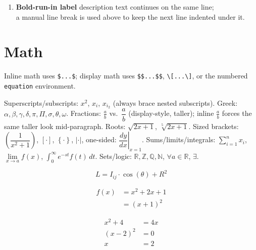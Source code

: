 \documentclass{article}
\newcommand{\set}[1]{\setlength\itemsep{#1em}} %
\begin{document}
\begin{enumerate}[leftmargin=*,label=]
    \set{0.5} %
    \item \textbf{Bold-run-in label} description text continues on the same line;\\
        a manual line break is used above to keep the next line indented under it.
\end{enumerate}

\section{Math}

Inline math uses \verb|$...$|; display math uses \verb|$$...$$|, \verb|\[...\]|,
or the numbered \verb|equation| environment.

Superscripts/subscripts: $x^2$, $x_i$, $x_{i_2}$ (always brace nested subscripts).
Greek: $\alpha, \beta, \gamma, \delta, \pi, \Pi, \sigma, \theta, \omega$.
Fractions: $\frac{a}{b}$ vs.\ $\dfrac{a}{b}$ (display-style, taller); inline
$\displaystyle\frac{a}{b}$ forces the same taller look mid-paragraph.
Roots: $\sqrt{2x+1}$, $\sqrt[5]{2x+1}$.
Sized brackets: $\left(\dfrac{1}{x^2+1}\right)$, $\left[\cdot\right]$,
$\left\{\cdot\right\}$, $\left|\cdot\right|$, one-sided: $\left.\dfrac{dy}{dx}\right|_{x=1}$.
Sums/limits/integrals: $\sum_{i=1}^{n} x_i$, $\lim\limits_{x \to a} f(x)$,
$\int_{0}^{\infty} e^{-st} f(t)\,dt$.
Sets/logic: $\mathbb{R}, \mathbb{Z}, \mathbb{Q}, \mathbb{N}$, $\forall a \in \mathbb{R}$,
$\exists$.

\begin{equation}
    L = I_{ij} \cdot \cos(\theta) + R^2 \label{eq:sample}
\end{equation}

\begin{equation}
\begin{split}
    f(x) &= x^2 + 2x + 1 \\
         &= (x+1)^2
\end{split}
\end{equation}

\begin{align}
    x^2 + 4 &= 4x \\
    (x-2)^2 &= 0 \\
    x &= 2
\end{align}
\end{document}
